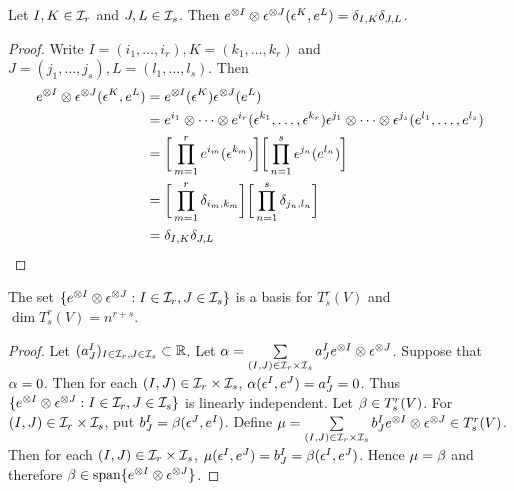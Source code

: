 \documentclass{book}
\begin{document}
	\begin{ex}
	Let $I, K \in \mathcal{I}_r$  and $J, L \in \mathcal{I}_s$. Then $e^{\otimes I} \otimes \epsilon^{\otimes J}(\epsilon^K, e^L) = \delta_{I,K} \delta_{J,L}$. 
	\end{ex}	
	
	\begin{proof}
	Write $I = (i_1, \dots, i_r), K=(k_1, \dots, k_r)$ and $J = (j_1, \dots, j_s), L = (l_1, \dots, l_s)$. Then 
	\begin{align*}
	e^{\otimes I} \otimes \epsilon^{\otimes J}(\epsilon^K, e^L) 
	&= e^{\otimes I}(\epsilon^K)\epsilon^{\otimes J}(e^L) \\
	&= e^{i_1}\otimes \dots \otimes e^{i_r}(\epsilon^{k_1}, \dots, \epsilon^{k_r}) \epsilon^{j_1}\otimes \dots \otimes \epsilon^{j_s}(e^{l_1}, \dots, e^{l_s}) \\
	&=\bigg[\prod_{m=1}^r e^{i_m}(\epsilon^{k_m}) \bigg] \bigg[ \prod_{n=1}^s  \epsilon^{j_n}(e^{l_n}) \bigg] \\
	&= \bigg[\prod_{m=1}^r \delta_{i_m, k_m} \bigg] \bigg[ \prod_{n=1}^s  \delta_{j_n, l_n} \bigg] \\
	&= \delta_{I,K}\delta_{J,L}
	\end{align*}
\end{proof}		
		
	\begin{ex}
		The set $\{e^{\otimes I} \otimes \epsilon^{\otimes J}: I \in \mathcal{I}_r, J \in \mathcal{I}_s\}$ is a basis for $T^r_s(V)$ and $\dim T^r_s(V) = {n^{r+s}}$.
	\end{ex}

	\begin{proof}
		Let $(a^I_J)_{I \in \mathcal{I}_r, J \in \mathcal{I}_s} \subset \mathbb{R}$. Let $\alpha = \sum\limits_{(I,J) \in \mathcal{I}_r \times \mathcal{I}_s} a^I_J e^{\otimes I} \otimes  \epsilon^{\otimes J}$. 
		Suppose that $\alpha = 0$. Then for each $(I,J) \in \mathcal{I}_r \times \mathcal{I}_s$, $\alpha(\epsilon^I, e^J) = a^I_J = 0$. Thus $\{e^{\otimes I} \otimes \epsilon^{\otimes J}: I \in \mathcal{I}_r, J \in \mathcal{I}_s\}$ is linearly independent. Let $\beta \in T^r_s(V)$. For $(I,J) \in \mathcal{I}_r \times \mathcal{I}_s$, put $b^I_J = \beta(\epsilon^J, e^I)$. Define $\mu = \sum\limits_{(I,J) \in \mathcal{I}_r \times \mathcal{I}_s} b^I_J e^{\otimes I} \otimes \epsilon^{\otimes J} \in T^r_s(V)$. Then for each $(I,J) \in \mathcal{I}_r \times \mathcal{I}_s$, $\mu(\epsilon^I, e^J) = b^I_J = \beta(\epsilon^I, e^J)$. Hence $\mu = \beta$ and therefore $\beta \in \operatorname{span} \{e^{\otimes I} \otimes \epsilon^{\otimes J} \}$.
	\end{proof}		
		
		
		
		
	
	
	
	
	
\end{document}
